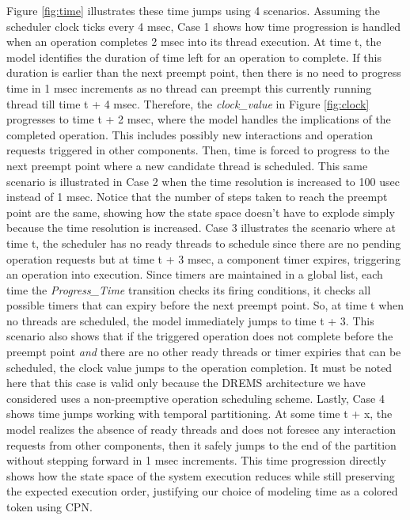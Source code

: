 Figure \ref{fig:time} illustrates these time jumps using 4 scenarios. Assuming the scheduler clock ticks every 4 msec, Case 1 shows how time progression is handled when an operation completes 2 msec into its thread execution. At time t, the model identifies the duration of time left for an operation to complete. If this duration is earlier than the next preempt point, then there is no need to progress time in 1 msec increments as no thread can preempt this currently running thread till time t + 4 msec. Therefore, the \emph{clock\_value} in Figure \ref{fig:clock} progresses to time t + 2 msec, where the model handles the implications of the completed operation. This includes possibly new interactions and operation requests triggered in other components. Then, time is forced to progress to the next preempt point where a new candidate thread is scheduled. This same scenario is illustrated in Case 2 when the time resolution is increased to 100 usec instead of 1 msec. Notice that the number of steps taken to reach the preempt point are the same, showing how the state space doesn't have to explode simply because the time resolution is increased. Case 3 illustrates the scenario where at time t, the scheduler has no ready threads to schedule since there are no pending operation requests but at time t + 3 msec, a component timer expires, triggering an operation into execution. Since timers are maintained in a global list, each time the \emph{Progress\_Time} transition checks its firing conditions, it checks all possible timers that can expiry before the next preempt point. So, at time t when no threads are scheduled, the model immediately jumps to time t + 3. This scenario also shows that if the triggered operation does not complete before the preempt point \emph{and} there are no other ready threads or timer expiries that can be scheduled, the clock value jumps to the operation completion. It must be noted here that this case is valid only because the DREMS architecture we have considered uses a non-preemptive operation scheduling scheme. Lastly, Case 4 shows time jumps working with temporal partitioning. At some time t + x, the model realizes the absence of ready threads and does not foresee any interaction requests from other components, then it safely jumps to the end of the partition without stepping forward in 1 msec increments. This time progression directly shows how the state space of the system execution reduces while still preserving the expected execution order, justifying our choice of modeling time as a colored token using CPN. 


